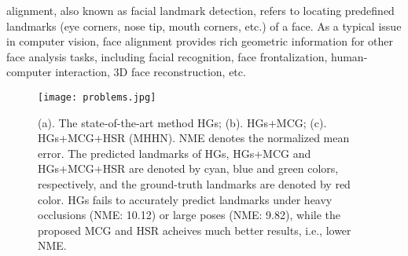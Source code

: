 \documentclass[journal]{IEEEtran}
\begin{document}
 alignment, also known as facial landmark detection, refers to locating predefined landmarks (eye corners, nose tip, mouth corners, etc.) of a face. As a typical issue in computer vision, face alignment provides rich geometric information for other face analysis tasks, including facial recognition, face frontalization, human-computer interaction, 3D face reconstruction, etc.
\begin{figure}[t]
	\begin{center}
		\texttt{[image: problems.jpg]}	
	\end{center}
	\caption{(a). The state-of-the-art method HGs\cite{Yang2017StackedHN}; (b). HGs+MCG; (c). HGs+MCG+HSR (MHHN). NME denotes the normalized mean error. The predicted landmarks of HGs, HGs+MCG and HGs+MCG+HSR are denoted by cyan, blue and green colors, respectively, and the ground-truth landmarks are denoted by red color. HGs fails to accurately predict landmarks under heavy occlusions (NME: 10.12) or large poses (NME: 9.82), while the proposed MCG and HSR acheives much better results, i.e., lower NME.}
	\label{figproblem}
\end{figure}
\end{document}
